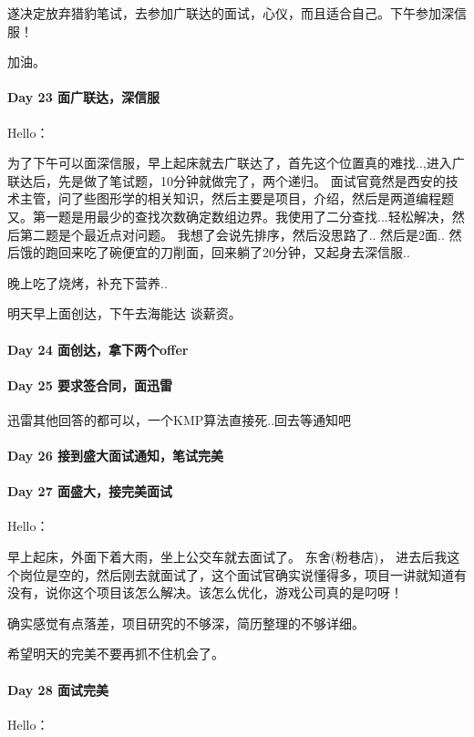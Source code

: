 \documentclass[UTF8,a4paper,8pt]{ctexart}
\begin{document}
		遂决定放弃猎豹笔试，去参加广联达的面试，心仪，而且适合自己。下午参加深信服！
		
		加油。
 	 \paragraph{Day 23  面广联达，深信服    \quad     }
	 	 Hello：
	 	 
	 	 为了下午可以面深信服，早上起床就去广联达了，首先这个位置真的难找..,进入广联达后，先是做了笔试题，10分钟就做完了，两个递归。
	 	 面试官竟然是西安的技术主管，问了些图形学的相关知识，然后主要是项目，介绍，然后是两道编程题又。第一题是用最少的查找次数确定数组边界。我使用了二分查找...轻松解决，然后第二题是个最近点对问题。 我想了会说先排序，然后没思路了.. 然后是2面.. 然后饿的跑回来吃了碗便宜的刀削面，回来躺了20分钟，又起身去深信服..
	 	 
	 	 晚上吃了烧烤，补充下营养..
	 	
	 	 明天早上面创达，下午去海能达 谈薪资。
	 	 
 	 \paragraph{Day 24  面创达，拿下两个offer    \quad     }
 	 \paragraph{Day 25  要求签合同，面迅雷   \quad     }
	 	 迅雷其他回答的都可以，一个KMP算法直接死..回去等通知吧
	 	 
	 	 
 	 \paragraph{Day 26  接到盛大面试通知，笔试完美    \quad     }
 	 \paragraph{Day 27  面盛大，接完美面试    \quad     }
	 	 Hello：
	 	 
	 	 早上起床，外面下着大雨，坐上公交车就去面试了。 东舍(粉巷店)， 进去后我这个岗位是空的，然后刚去就面试了，这个面试官确实说懂得多，项目一讲就知道有没有，说你这个项目该怎么解决。该怎么优化，游戏公司真的是叼呀！
	 	 
	 	 确实感觉有点落差，项目研究的不够深，简历整理的不够详细。
	 	 
	 	 希望明天的完美不要再抓不住机会了。
 	 \paragraph{Day 28  面试完美    \quad     }
	 	 Hello：
	 	 
\end{document}
